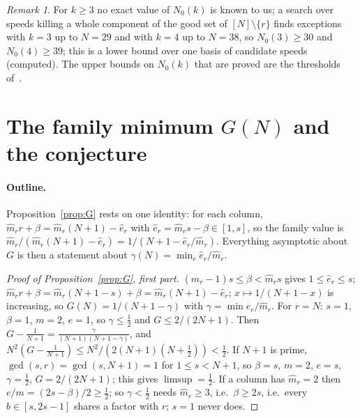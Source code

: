 \documentclass[11pt]{article}
\theoremstyle{definition}
\theoremstyle{remark}
\newtheorem{remark}[theorem]{Remark}
\newcommand{\xC}[1]{\ref{B-#1}}
\begin{document}
\begin{remark}
For $k\ge3$ no exact value of $N_0(k)$ is known to us; a search over speeds killing a whole component of the good set of $[N]\setminus\{r\}$ finds exceptions with $k=3$ up to $N=29$ and with $k=4$ up to $N=38$, so $N_0(3)\ge30$ and $N_0(4)\ge39$; this is a lower bound over one basis of candidate speeds (computed). The upper bounds on $N_0(k)$ that are proved are the thresholds of~\cite[Theorem~\xC{thm:thr}]{B}.
\end{remark}



\section{The family minimum $G(N)$ and the conjecture}\label{sec:G}

\paragraph{Outline.}
Proposition~\ref{prop:G} rests on one identity: for each column, $\hat m_rr+\beta=\hat m_r(N+1)-\hat e_r$ with $\hat e_r=\hat m_rs-\beta\in[1,s]$, so the family value is $\hat m_r/(\hat m_r(N+1)-\hat e_r)=1/(N+1-\hat e_r/\hat m_r)$. Everything asymptotic about $G$ is then a statement about $\gamma(N)=\min_r\hat e_r/\hat m_r$.

\begin{proof}[Proof of Proposition~\ref{prop:G}, first part]
$(\hat m_r-1)s\le\beta<\hat m_rs$ gives $1\le \hat e_r\le s$; $\hat m_rr+\beta=\hat m_r(N+1-s)+\beta=\hat m_r(N+1)-\hat e_r$; $x\mapsto1/(N+1-x)$ is increasing, so $G(N)=1/(N+1-\gamma)$ with $\gamma=\min \hat e_r/\hat m_r$. For $r=N$: $s=1$, $\beta=1$, $m=2$, $e=1$, so $\gamma\le\frac12$ and $G\le2/(2N+1)$. Then $G-\frac1{N+1}=\frac{\gamma}{(N+1)(N+1-\gamma)}$, and $N^2(G-\frac1{N+1})\le N^2/(2(N+1)(N+\frac12))<\frac12$. If $N+1$ is prime, $\gcd(s,r)=\gcd(s,N+1)=1$ for $1\le s<N+1$, so $\beta=s$, $m=2$, $e=s$, $\gamma=\frac12$, $G=2/(2N+1)$; this gives $\limsup=\frac12$. If a column has $\hat m_r=2$ then $e/m=(2s-\beta)/2\ge\frac12$; so $\gamma<\frac12$ needs $\hat m_r\ge3$, i.e.\ $\beta\ge2s$, i.e.\ every $b\in[s,2s-1]$ shares a factor with $r$; $s=1$ never does.
\end{proof}
\end{document}
